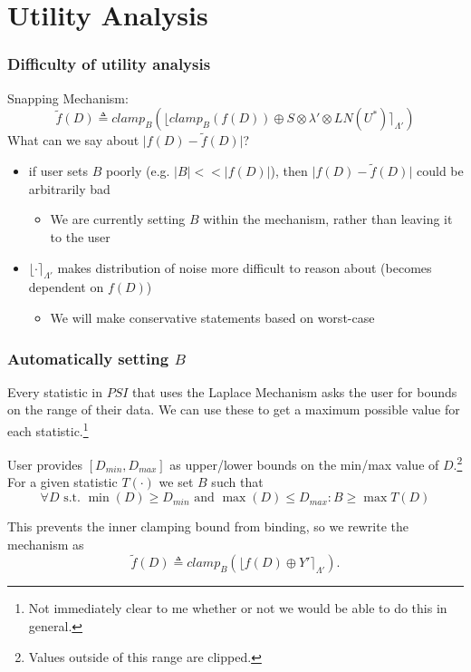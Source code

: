 \documentclass{beamer}
\begin{document}
\section{Utility Analysis}
\begin{frame}
    \frametitle{Difficulty of utility analysis}
    Snapping Mechanism:
    \[ \tilde{f}(D) \triangleq clamp_{B} \left( \lfloor clamp_{B}(f(D)) \oplus S \otimes \lambda' \otimes LN(U^*) \rceil_{\Lambda'} \right) \]
    What can we say about $\vert f(D) - \tilde{f}(D) \vert$?
    \begin{itemize}
        \item if user sets $B$ poorly (e.g. $\vert B \vert << \vert f(D) \vert$), then
        $\vert f(D) - \tilde{f}(D) \vert$ could be arbitrarily bad
        \begin{itemize}
            \item We are currently setting $B$ within the mechanism,
            rather than leaving it to the user
        \end{itemize}
        \item $\lfloor \cdot \rceil_{\Lambda'}$ makes distribution of noise more difficult to reason about
        (becomes dependent on $f(D)$)
        \begin{itemize}
            \item We will make conservative statements based on worst-case
        \end{itemize}
    \end{itemize}
\end{frame}

\begin{frame}
    \frametitle{Automatically setting $B$}
    Every statistic in $PSI$ that uses the Laplace Mechanism asks the user for bounds on the
    range of their data. We can use these to get a maximum possible value for
    each statistic.\footnote{Not immediately clear to me whether or not we would be able to do this in general.}

    User provides $[D_{min}, D_{max}]$ as upper/lower bounds on the min/max value of $D$.\footnote{Values
    outside of this range are clipped.}
    For a given statistic $T(\cdot)$ we set $B$ such that
    \[ \forall D \text{ s.t. } \min(D) \geq D_{min} \text{ and } \max(D) \leq D_{max}: B \geq \max T(D) \]

    This prevents the inner clamping bound from binding, so we rewrite the mechanism as
    \[ \tilde{f}(D) \triangleq clamp_{B} \left( \lfloor f(D) \oplus Y' \rceil_{\Lambda'} \right). \]
\end{frame}
\end{document}
